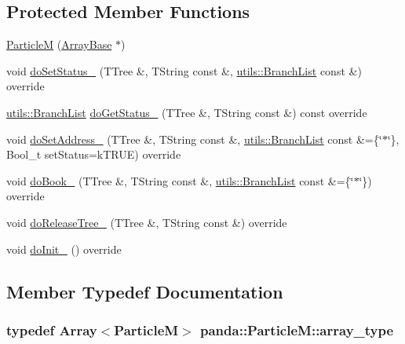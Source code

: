 \subsection*{Protected Member Functions}
\begin{DoxyCompactItemize}
\item 
\hyperlink{classpanda_1_1ParticleM_a591019bfbe692da09fbf9c4aa3e5e4d5}{ParticleM} (\hyperlink{classpanda_1_1ArrayBase}{ArrayBase} $\ast$)
\item 
void \hyperlink{classpanda_1_1ParticleM_a042f9e295576be022960ea88144e9022}{doSetStatus\_\-} (TTree \&, TString const \&, \hyperlink{classpanda_1_1utils_1_1BranchList}{utils::BranchList} const \&) override
\item 
\hyperlink{classpanda_1_1utils_1_1BranchList}{utils::BranchList} \hyperlink{classpanda_1_1ParticleM_a003a63672058369e9bbea413e055b1c1}{doGetStatus\_\-} (TTree \&, TString const \&) const override
\item 
void \hyperlink{classpanda_1_1ParticleM_ab54d46a237f8d12074ee36c48af33b04}{doSetAddress\_\-} (TTree \&, TString const \&, \hyperlink{classpanda_1_1utils_1_1BranchList}{utils::BranchList} const \&=\{\char`\"{}$\ast$\char`\"{}\}, Bool\_\-t setStatus=kTRUE) override
\item 
void \hyperlink{classpanda_1_1ParticleM_a55d6e7e91edbc88e980a0031c299ef18}{doBook\_\-} (TTree \&, TString const \&, \hyperlink{classpanda_1_1utils_1_1BranchList}{utils::BranchList} const \&=\{\char`\"{}$\ast$\char`\"{}\}) override
\item 
void \hyperlink{classpanda_1_1ParticleM_a0c24df56cbd50a8223fc4d8bf0b776d0}{doReleaseTree\_\-} (TTree \&, TString const \&) override
\item 
void \hyperlink{classpanda_1_1ParticleM_ae912914e3970c1fb238589f0ccc783f4}{doInit\_\-} () override
\end{DoxyCompactItemize}


\subsection{Member Typedef Documentation}
\hypertarget{classpanda_1_1ParticleM_a1ba36e35f5cd6a26decfbaa815678d2a}{
\subsubsection[{array\_\-type}]{\setlength{\rightskip}{0pt plus 5cm}typedef {\bf Array}$<${\bf ParticleM}$>$ {\bf panda::ParticleM::array\_\-type}}}
\label{classpanda_1_1ParticleM_a1ba36e35f5cd6a26decfbaa815678d2a}


